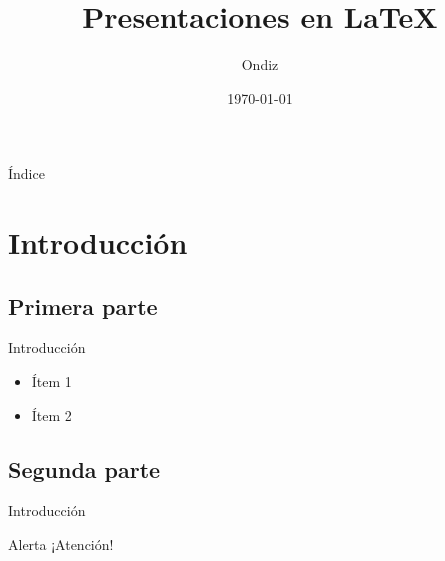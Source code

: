 \documentclass{beamer}
\title{\bfseries Presentaciones en \LaTeX}
\author{Ondiz}
\institute{Home, sweet home}
\date{\today}
\begin{document}
 
 \begin{frame}
  \maketitle
 \end{frame}
 
 \begin{frame}{Índice}
  \tableofcontents
 \end{frame}
 
 \section{Introducción}
 \subsection{Primera parte}

 \begin{frame}{Introducción}
  \begin{itemize}
   \item<1-> Ítem 1
   \item<2-> Ítem 2
  \end{itemize}
 \end{frame}
 
 \subsection{Segunda parte}
 
   \begin{frame}{Introducción}
     \begin{block}{Alerta}
      ¡Atención!
     \end{block}

   \end{frame}
 
\end{document}
